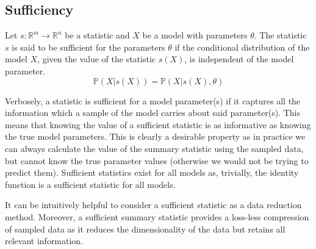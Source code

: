 \documentclass[11pt,a4paper]{article}
\newcommand*{\prob}{\mathbb{P}}
\theoremstyle{break}
\begin{document}
\subsection*{Sufficiency}\label{sec_sufficiency}

  \begin{box_definition}\label{def_sufficient_statistic}
    Let $s:\mathbb{R}^m\to\mathbb{R}^n$ be a statistic and $X$ be a model with parameters $\theta$. The statistic $s$ is said to be sufficient for the parameters $\theta$ if the conditional distribution of the model $X$, given the value of the statistic $s(X)$, is independent of the model parameter.
    \[ \prob(X|s(X))=\prob(X|s(X),\theta) \]
  \end{box_definition}

  \par Verbosely, a statistic is sufficient for a model parameter(s) if it captures all the information which a sample of the model carries about said parameter(s). This means that knowing the value of a sufficient statistic is as informative as knowing the true model parameters. This is clearly a desirable property as in practice we can always calculate the value of the summary statistic using the sampled data, but cannot know the true parameter values (otherwise we would not be trying to predict them). Sufficient statistics exist for all models as, trivially, the identity function is a sufficient statistic for all models.

  \par It can be intuitively helpful to consider a sufficient statistic as a data reduction method. Moreover, a sufficient summary statistic provides a loss-less compression of sampled data as it reduces the dimensionality of the data but retains all relevant information.
\end{document}
